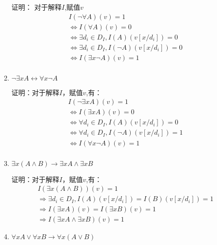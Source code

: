 \documentclass[UTF8]{ctexart}
\begin{document}
\begin{enumerate}
\begin{enumerate}
            证明：
            对于解释$I$,赋值$v$
            \[
                \begin{aligned}
                    &I(\neg \forall A)(v)=1\\
                    &\Leftrightarrow I(\forall A)(v)=0\\
                    &\Leftrightarrow \exists d_i\in D_I,I(A)(v[x/d_i])=0\\
                    &\Leftrightarrow \exists d_i\in D_I,I(\neg A)(v[x/d_i])=0\\
                    &\Leftrightarrow I(\exists x \neg A)(v)=1\\
                \end{aligned}
            \]

            \item $\neg \exists xA\leftrightarrow \forall x\neg A$
            
            证明：对于解释$I$，赋值$v$,有：
            \[
                \begin{aligned}
                    &I(\neg \exists x A)(v)=1\\
                    &\Leftrightarrow I(\exists x A)(v)=0\\
                    &\Leftrightarrow \forall d_i\in D_I,I(A)(v[x/d_i])=0\\
                    &\Leftrightarrow \forall d_i\in D_I,I(\neg A)(v[x/d_i])=1\\
                    &\Leftrightarrow I(\forall x\neg A)(v)=1\\
                \end{aligned}
            \]
            
            \item $\exists x(A\wedge B)\rightarrow \exists xA\wedge \exists x B$
            
            证明：对于解释$I$，赋值$v$,有：
            \[
                \begin{aligned}
                    &I(\exists x(A\wedge B))(v)=1\\
                    &\Rightarrow \exists d_i\in D_I,I(A)(v[x/d_i])=I(B)(v[x/d_i])=1\\
                    &\Rightarrow I(\exists xA)(v)=I(\exists xB)(v)=1\\
                    &\Rightarrow I(\exists xA\wedge \exists xB)(v)=1
                \end{aligned}
            \]

            \item $\forall xA \vee \forall xB\rightarrow \forall x(A\vee B)$
            

\end{enumerate}
\end{enumerate}
\end{document}
